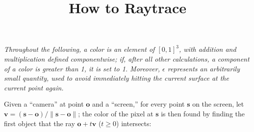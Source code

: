 \documentclass{article}
\title{How to Raytrace}
\renewcommand{\v}{\mathbf}
\begin{document}
\maketitle

\emph{Throughout the following, a color is an element of $[0,1]^3$, with
addition and multiplication defined componentwise; if, after all other
calculations, a component of a color is greater than 1, it is set to 1.
Moreover, $\epsilon$ represents an arbitrarily small quantity, used to avoid
immediately hitting the current surface at the current point again.}

\vspace{2ex}

Given a ``camera'' at point $\v{o}$ and a ``screen,'' for every point $\v{s}$
on the screen, let $\v{v} = (\v{s}-\v{o})/\|\v{s}-\v{o}\|$; the color of the
pixel at $\v{s}$ is then found by finding the first object that the ray
$\v{o}+t\v{v}$ ($t\geq 0$) intersects:
\end{document}

